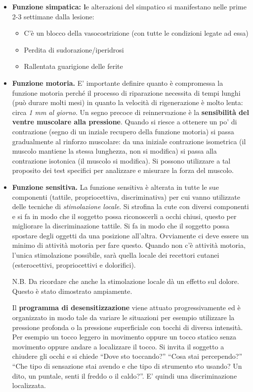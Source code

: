 \begin{itemize}
\item
  \textbf{Funzione simpatica: l}e alterazioni del simpatico si
  manifestano nelle prime 2-3 settimane dalla lesione:
  \begin{itemize}
\item
  C'è un blocco della vasocostrizione (con tutte le condizioni legate ad
  essa)
\item
  Perdita di sudorazione/iperidrosi
\item
  Rallentata guarigione delle ferite
\end{itemize}

\item
  \textbf{Funzione motoria.} E' importante definire quanto è compromessa
  la funzione motoria perché il processo di riparazione necessita di
  tempi lunghi (può durare molti mesi) in quanto la velocità di
  rigenerazione è molto lenta: circa \emph{1 mm al giorno}. Un segno
  precoce di reinnervazione è la \textbf{sensibilità del ventre
  muscolare alla pressione}. Quando si riesce a ottenere un po' di
  contrazione (segno di un inziale recupero della funzione motoria) si
  passa gradualmente al rinforzo muscolare: da una iniziale contrazione
  isometrica (il muscolo mantiene la stessa lunghezza, non si modifica)
  si passa alla contrazione isotonica (il muscolo si modifica). Si
  possono utilizzare a tal proposito dei test specifici per analizzare e
  misurare la forza del muscolo.
\item
  \textbf{Funzione sensitiva.} La funzione sensitiva è alterata in tutte
  le sue componenti (tattile, propriocettiva, discriminativa) per cui
  vanno utilizzate delle tecniche di \emph{stimolazione locale}. Si
  strofina la cute con diversi componenti e si fa in modo che il
  soggetto possa riconoscerli a occhi chiusi, questo per migliorare la
  discriminazione tattile. Si fa in modo che il soggetto possa spostare
  degli oggetti da una posizione all'altra. Ovviamente ci deve essere un
  minimo di attività motoria per fare questo. Quando non c'è attività
  motoria, l'unica stimolazione possibile, sarà quella locale dei
  recettori cutanei (esterocettivi, propriocettivi e dolorifici).

N.B. Da ricordare che anche la stimolazione locale dà un effetto sul
dolore. Questo è stato dimostrato ampiamente.

Il \textbf{programma di desensitizzazione} viene attuato
progressivamente ed è organizzato in modo tale da variare le situazioni
per esempio utilizzare la pressione profonda o la pressione superficiale
con tocchi di diversa intensità. Per esempio un tocco leggero in
movimento oppure un tocco statico senza movimento oppure andare a
localizzare il tocco. Si invita il soggetto a chiudere gli occhi e si
chiede ``Dove sto toccando?'' ``Cosa stai percependo?'' ``Che tipo di
sensazione stai avendo e che tipo di strumento sto usando? Un dito, un
puntale, senti il freddo o il caldo?''. E' quindi una discriminazione
localizzata.


\end{itemize}
